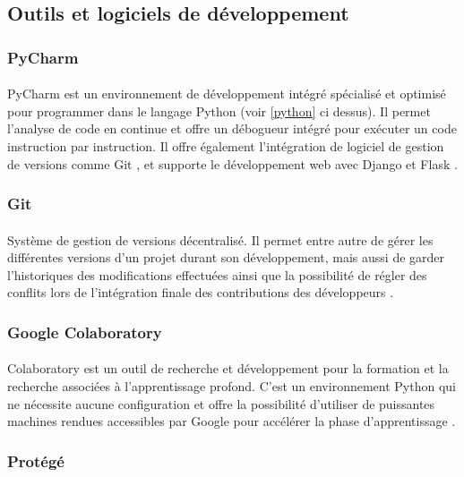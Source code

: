 	\subsection{Outils et logiciels de développement}
		\subsubsection*{PyCharm}
		\paragraph{}
		PyCharm est un environnement de développement intégré spécialisé et optimisé pour programmer dans le langage Python (voir \ref{python} ci dessus). Il permet l'analyse de code en continue et offre un débogueur intégré pour exécuter un code instruction par instruction. Il offre également l'intégration de logiciel de gestion de versions comme Git \cite{git}, et supporte le développement web avec Django et Flask \cite{pycharm}.
		
		\subsubsection*{Git}
		\paragraph{}
		Système de gestion de versions décentralisé. Il permet entre autre de gérer les différentes versions d'un projet durant son développement, mais aussi de garder l'historiques des modifications effectuées ainsi que la possibilité de régler des conflits lors de l'intégration finale des contributions des développeurs \cite{Git}.
		
		\subsubsection*{Google Colaboratory}
		\paragraph{}
		Colaboratory est un outil de recherche et développement pour la formation et la recherche associées à l'apprentissage profond. C'est un environnement Python qui ne nécessite aucune configuration et offre la possibilité d'utiliser de puissantes machines rendues accessibles par Google pour accélérer la phase d'apprentissage \cite{colab}.
		
		\subsubsection*{Protégé}
